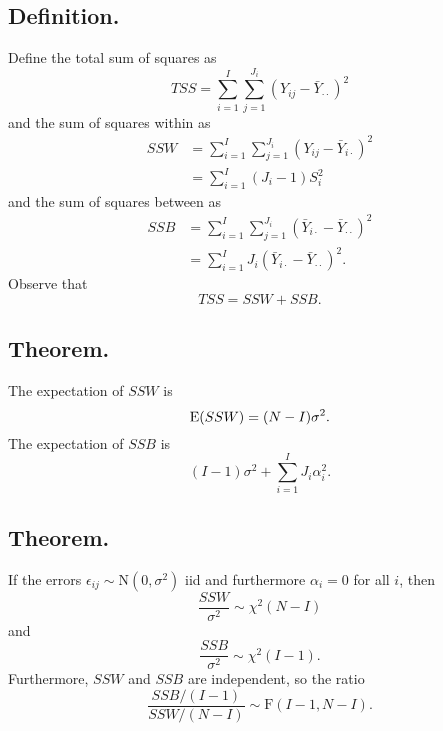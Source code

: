 \documentclass[titlepage]{article}
\begin{document}
\subsection{Definition.} Define the total sum of squares as 
$$TSS = \sum_{i=1}^{I}\sum_{j=1}^{J_{i}}(Y_{ij} - \bar{Y}_{\cdot\cdot})^{2}$$
and the sum of squares within as 
\begin{align*}
    SSW &= \sum_{i=1}^{I}\sum_{j=1}^{J_{i}}(Y_{ij} - \bar{Y}_{i\cdot})^{2} \\
        &= \sum_{i=1}^{I}(J_{i}-1)S_{i}^{2}
\end{align*}
and the sum of squares between as
\begin{align*}
    SSB &= \sum_{i=1}^{I}\sum_{j=1}^{J_{i}}(\bar{Y}_{i\cdot} - \bar{Y}_{\cdot\cdot})^{2} \\
        &= \sum_{i=1}^{I}J_{i}(\bar{Y}_{i\cdot} - \bar{Y}_{\cdot\cdot})^{2}.
\end{align*}
Observe that 
$$TSS = SSW + SSB.$$

\subsection{Theorem.} The expectation of $SSW$ is 
$$\text{E}(SSW) = (N-I)\sigma^{2}.$$
The expectation of $SSB$ is
$$(I-1)\sigma^{2} + \sum_{i=1}^{I}J_{i}\alpha_{i}^{2}.$$

\subsection{Theorem.} If the errors $\epsilon_{ij} \sim \text{N}(0, \sigma^{2})$ iid and furthermore $\alpha_{i} = 0$ for all $i$, then
$$\frac{SSW}{\sigma^{2}} \sim \chi^{2}(N-I)$$
and 
$$\frac{SSB}{\sigma^{2}} \sim \chi^{2}(I-1).$$
Furthermore, $SSW$ and $SSB$ are independent, so the ratio 
$$\frac{SSB/(I-1)}{SSW/(N-I)} \sim \text{F}(I-1, N-I).$$
\end{document}
